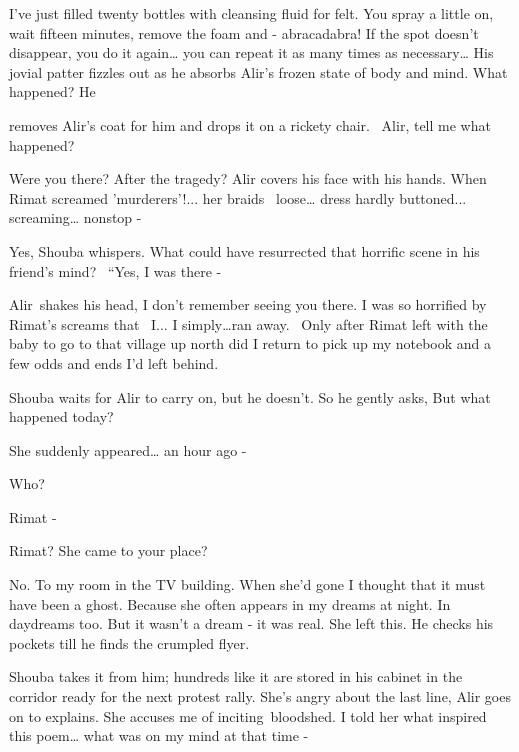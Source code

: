 \documentclass[letterpaper]{article}
\begin{document}
{\textquotedbl}I've just filled twenty bottles with cleansing fluid for felt. You spray a little on, wait fifteen
minutes, remove the foam and - abracadabra! If the spot doesn't disappear, you do it again{\dots} you can repeat it as
many times as necessary{\dots}{\textquotedbl} His jovial patter fizzles out as he absorbs Alir's frozen state of body
and mind. {\textquotedbl}What happened?{\textquotedbl} He

removes Alir's coat for him and drops it on a rickety chair. \ {\textquotedbl}Alir, tell me what
happened?{\textquotedbl} 

{\textquotedbl}Were you there? After the tragedy?{\textquotedbl} Alir covers his face with his hands.
{\textquotedbl}When Rimat screamed 'murderers'!... her braids \ loose{\dots} dress hardly buttoned... screaming{\dots}
nonstop -{\textquotedbl}

{\textquotedbl}Yes,{\textquotedbl} Shouba whispers. What could have resurrected that horrific scene in his friend's
mind? \ {}``Yes, I was there -{\textquotedbl}

Alir~shakes his head, {\textquotedbl}I don't remember seeing you there.{ }I was so horrified by Rimat's
screams that \ I... I simply{\dots}ran away. \ Only after Rimat left with the baby to go to that village up north did I
return to pick up my notebook and a few odds and ends I'd left behind.{\textquotedbl}

Shouba waits for Alir to carry on, but he doesn't. So he gently asks, {\textquotedbl}But what happened
today?{\textquotedbl} 

{\textquotedbl}She suddenly appeared{\dots} an hour ago -{\textquotedbl} 

{\textquotedbl}Who?{\textquotedbl} 

{\textquotedbl}Rimat -{\textquotedbl} 

{\textquotedbl}Rimat? She came to your place?{\textquotedbl} 

{\textquotedbl}No. To my room in the TV building. When she'd gone I thought that it must have been a ghost. Because she
often appears in my dreams at night. In daydreams too. But it wasn't a dream - it was real. She left
this.{\textquotedbl} He checks his pockets till he finds the crumpled flyer.

Shouba takes it from him; hundreds like it are stored in his cabinet in the corridor ready for the next protest rally.
{\textquotedbl}She's angry about the last line,{\textquotedbl} Alir goes on to explains. {\textquotedbl}She accuses me
of inciting~bloodshed. I told her what inspired this poem{\dots} what was on my mind at that time -{\textquotedbl}
\end{document}
